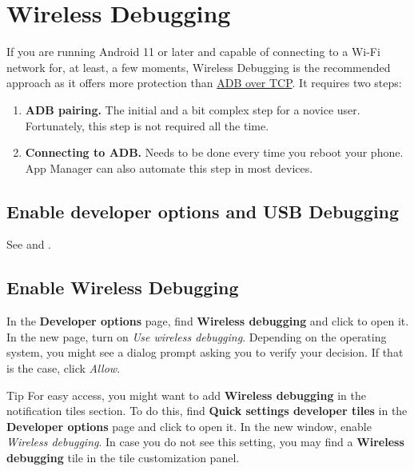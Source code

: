 \section{Wireless Debugging}\label{sec:wireless-debugging} %
If you are running Android 11 or later and capable of connecting to a Wi-Fi network for, at least, a few moments,
Wireless Debugging is the recommended approach as it offers more protection than \hyperref[sec:adb-over-tcp]{ADB over TCP}.
It requires two steps:
\begin{enumerate}
    \item \textbf{ADB pairing.} The initial and a bit complex step for a novice user. Fortunately,
    this step is not required all the time.
    \item \textbf{Connecting to ADB.} Needs to be done every time you reboot your phone. App Manager
    can also automate this step in most devices.
\end{enumerate}

\subsection{Enable developer options and USB Debugging}\label{subsec:enable-developer-options-and-usb-debugging} %
See  and .

\subsection{Enable Wireless Debugging}\label{subsec:enable-wireless-debugging} %
In the \textbf{Developer options} page, find \textbf{Wireless debugging} and click to open it. In
the new page, turn on \textit{Use wireless debugging}. Depending on the operating system, you might
see a dialog prompt asking you to verify your decision. If that is the case, click \textit{Allow}.

\begin{tip}{Tip}
    For easy access, you might want to add \textbf{Wireless debugging} in the notification tiles
    section. To do this, find \textbf{Quick settings developer tiles} in the \textbf{Developer
    options} page and click to open it. In the new window, enable \textit{Wireless debugging}.
    In case you do not see this setting, you may find a \textbf{Wireless debugging} tile in the tile
    customization panel.
\end{tip}


